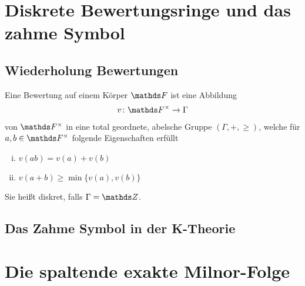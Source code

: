 \documentclass[ngerman,fontsize=11pt, paper=a4, parskip=half, titlepage=true, toc=bib]{scrartcl}
\begin{document}

\section{Diskrete Bewertungsringe und das zahme Symbol}
\cite[][Lemma 2.1]{milnor}

\subsection{Wiederholung Bewertungen}
\begin{Def}[Bewertungsabbildung]
Eine Bewertung auf einem Körper $\F$ ist eine Abbildung
\begin{gather*}
  v\colon\Fx\to \Gamma
\end{gather*}
von $\Fx$ in eine total geordnete, abelsche Gruppe $(\Gamma, +,\geq)$,
welche für $a,b\in\Fx$ folgende Eigenschaften erfüllt
\begin{enumerate}[i)]
\item $v(ab)=v(a)+v(b)$
\item $v(a+b)\geq \min\{v(a),v(b)\}$
\end{enumerate}
Sie heißt diskret, falls $\Gamma=\Z$.
\end{Def}

\begin{Def}\end{Def}

\subsection{Das Zahme Symbol in der K-Theorie}
\begin{Satz}\end{Satz}


\section{Die spaltende exakte Milnor-Folge}
\cite[][Theorem 2.3]{milnor}



\printindex

\nocite{*}
\printbibliography
\end{document}
